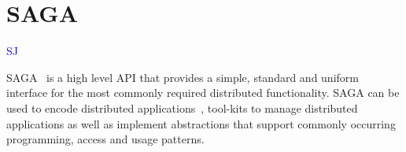 \documentclass[conference,final]{IEEEtran}
\begin{document}

\section{SAGA}  {\textcolor{blue} {SJ}}


SAGA~\cite{saga-core} is a high level API that provides a simple,
standard and uniform interface for the most commonly required
distributed functionality.  SAGA can be used to encode distributed
applications~\cite{saga_escience07_short, saga_tg08}, tool-kits to
manage distributed applications as well as implement abstractions that
support commonly occurring programming, access and usage patterns.
\end{document}
